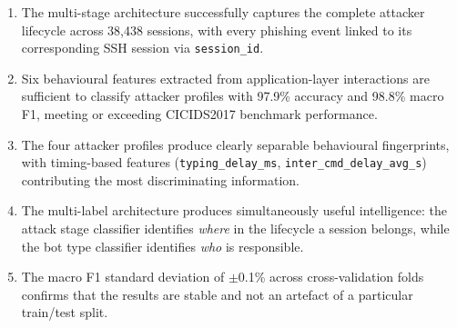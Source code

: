 \begin{enumerate}
    \item The multi-stage architecture successfully captures the complete
    attacker lifecycle across 38,438 sessions, with every phishing event
    linked to its corresponding SSH session via \texttt{session\_id}.

    \item Six behavioural features extracted from application-layer
    interactions are sufficient to classify attacker profiles with
    97.9\% accuracy and 98.8\% macro F1, meeting or exceeding
    CICIDS2017 benchmark performance.

    \item The four attacker profiles produce clearly separable
    behavioural fingerprints, with timing-based features
    (\texttt{typing\_delay\_ms}, \texttt{inter\_cmd\_delay\_avg\_s})
    contributing the most discriminating information.

    \item The multi-label architecture produces simultaneously useful
    intelligence: the attack stage classifier identifies \emph{where}
    in the lifecycle a session belongs, while the bot type classifier
    identifies \emph{who} is responsible.

    \item The macro F1 standard deviation of $\pm$0.1\% across
    cross-validation folds confirms that the results are stable and
    not an artefact of a particular train/test split.
\end{enumerate}
